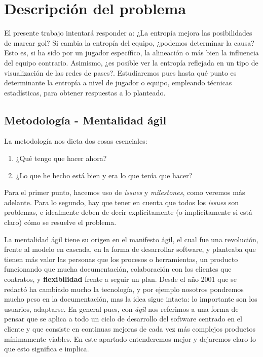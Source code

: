 \chapter{Descripción del problema}
El presente trabajo intentará responder a: ¿La entropía mejora las posibilidades 
de marcar gol? Si cambia la entropía del equipo, ¿podemos determinar la causa? Esto es, 
si ha sido por un jugador específico, la alineación o más bien la influencia del equipo 
contrario. Asimismo, ¿es posible ver la entropía reflejada en un tipo de visualización de 
las redes de pases?. Estudiaremos pues hasta qué punto es determinante la 
entropía a nivel de jugador o equipo, empleando técnicas estadísticas, para obtener respuestas a lo planteado.

\section{Metodología - Mentalidad ágil}
La metodología nos dicta dos cosas esenciales:
\begin{enumerate}
    \item ¿Qué tengo que hacer ahora?
    \item ¿Lo que he hecho está bien y era lo que tenía que hacer?
\end{enumerate}

Para el primer punto, hacemos uso de \textit{issues} y \textit{milestones}, 
como veremos más adelante. Para lo segundo, hay que tener en cuenta que todos 
los \textit{issues} son problemas, e idealmente deben de decir explícitamente 
(o implícitamente si está claro) cómo se resuelve el problema.

La mentalidad ágil tiene su origen en el manifesto ágil\cite{manifesto-agil}, el cual fue una revolución, frente 
al modelo en cascada,
en la forma de desarrollar software, y planteaba que tienen más valor las personas que 
los procesos o herramientas, un producto funcionando que mucha documentación, colaboración 
con los clientes que contratos, y \textbf{flexibilidad} frente a seguir un plan. Desde el 
año 2001 que se redactó ha cambiado mucho la tecnología, y por ejemplo nosotros pondremos 
mucho peso en la documentación, mas la idea sigue intacta: lo importante son los usuarios, 
adaptarse. En general pues, con \textit{ágil} nos referimos a una forma de pensar que se aplica 
a todo un ciclo de desarrollo del software centrado en el cliente y que consiste en 
continuas mejoras de cada vez más complejos productos mínimamente viables\cite{agile-science}.
En este apartado entenderemos mejor y dejaremos claro lo que esto significa e implica.


